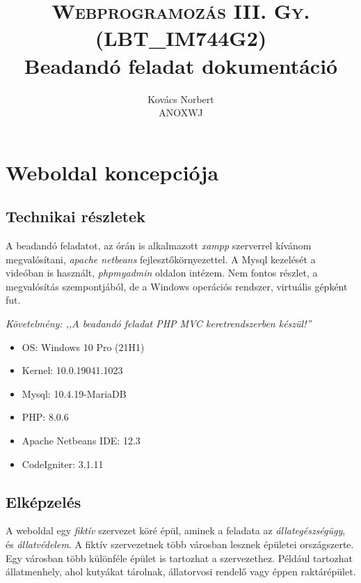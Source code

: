 \documentclass[a4paper,12pt]{article}
\begin{document}
\title{\textsc{Webprogramozás III. Gy. \\ {\normalsize (LBT\_IM744G2)}} \\ {\normalsize Beadandó feladat dokumentáció}}
\author{Kovács Norbert \\ ANOXWJ}
\maketitle
\newpage
\tableofcontents
\newpage


\section{Weboldal koncepciója}
\subsection{Technikai részletek}
A beadandó feladatot, az órán is alkalmazott \textit{xampp} szerverrel kívánom megvalósítani, \textit{apache netbeans} fejlesztőkörnyezettel. A Mysql kezelését a videóban is használt, \textit{phpmyadmin} oldalon intézem. Nem fontos részlet, a megvalósítás szempontjából, de a Windows operációs rendszer, virtuális gépként fut.

\begin{center}
	\textit{{\footnotesize Követelmény: ,,A beadandó feladat PHP MVC keretrendszerben készül!''}}
\end{center}

\begin{itemize}
	\item OS: Windows 10 Pro (21H1)
	\item Kernel: 10.0.19041.1023
	\item Mysql: 10.4.19-MariaDB
	\item PHP: 8.0.6
	\item Apache Netbeans IDE: 12.3
	\item CodeIgniter: 3.1.11
\end{itemize}

\subsection{Elképzelés}
A weboldal egy \textit{fiktív} szervezet köré épül, aminek a feladata  az \textit{állategészségügy}, és \textit{állatvédelem}. A fiktív szervezetnek több városban lesznek épületei országszerte. Egy városban több különféle épület is tartozhat a szervezethez. Például tartozhat állatmenhely, ahol kutyákat tárolnak, állatorvosi rendelő vagy éppen raktárépület.
\end{document}
